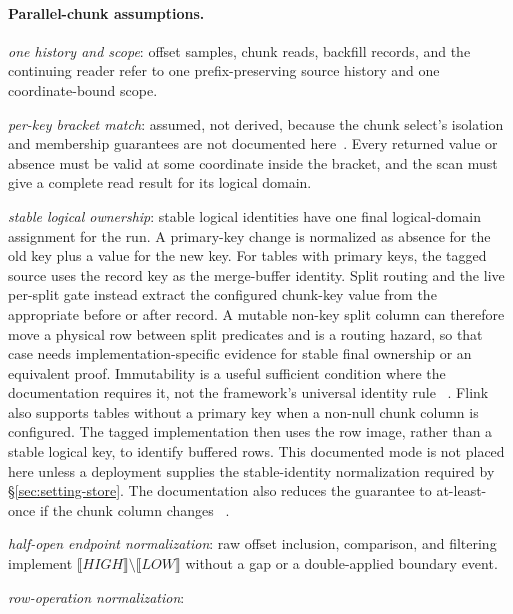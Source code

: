 \documentclass[sigconf,nonacm,10pt]{acmart}
\theoremstyle{plain}
\theoremstyle{definition}
\newcommand{\den}[1]{\llbracket #1 \rrbracket}   %
\begin{document}
\paragraph{Parallel-chunk assumptions.}
\begin{description}
\RaggedRight
\item[\textbf{A-source}] \emph{one history and scope}: offset samples,
chunk reads, backfill records, and the continuing reader refer to one
prefix-preserving source history and one coordinate-bound scope.
\item[\textbf{A-read}] \emph{per-key bracket match}: assumed,
not derived, because the chunk select's isolation and membership
guarantees are not documented here~\cite{flinkcdc_mysql}. Every
returned value or absence must be valid at some coordinate inside the bracket,
and the scan must give a complete read result for its logical domain.
\item[\textbf{A-identity}] \emph{stable logical ownership}: stable
logical identities have one final logical-domain assignment for the
run. A primary-key change is normalized as absence for the old key plus
a value for the new key. For tables with primary keys, the tagged source
uses the record key as the merge-buffer identity. Split routing and the
live per-split gate instead extract the configured chunk-key value from
the appropriate before or after record. A mutable non-key split column
can therefore move a physical row between split predicates and is a
routing hazard, so that case
needs implementation-specific evidence for stable final ownership or
an equivalent proof. Immutability is a useful sufficient condition
where the documentation requires it, not the framework's universal
identity rule
~\cite{flinkcdc_mysql,flinkcdc_source_code}. Flink also supports tables
without a primary key when a non-null chunk column is configured. The
tagged implementation then uses the row image, rather than a stable
logical key, to identify buffered rows. This documented mode is not
placed here unless a deployment supplies the stable-identity
normalization required by \S\ref{sec:setting-store}. The documentation
also reduces the guarantee to at-least-once if the chunk column changes
~\cite{flinkcdc_mysql,flinkcdc_source_code}.
\item[\textbf{A-edge}] \emph{half-open endpoint normalization}: raw
offset inclusion, comparison, and filtering implement
$\den{\mathit{HIGH}}\setminus\den{\mathit{LOW}}$ without a gap or a
double-applied boundary event.
\item[\textbf{A-normalize}] \emph{row-operation normalization}:

\end{description}
\end{document}
